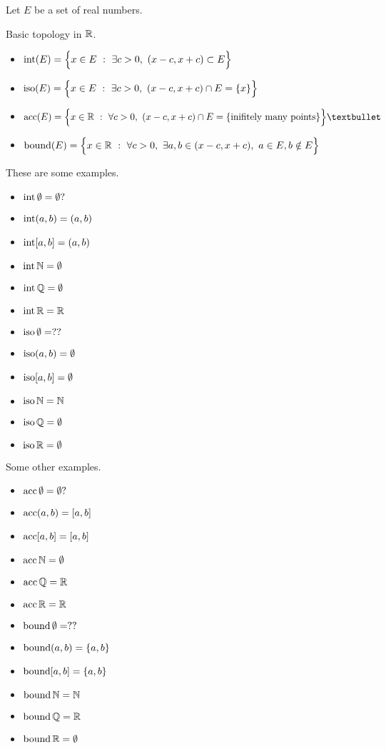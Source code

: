 Let $E$ be a set of real numbers.
\begin{definition}
  Basic topology in $\R$.
  \begin{itemize}
    \item $\operatorname{int}(E)=\Big\{x\in E~:~ \exists c>0,~(x-c,x+c)\subset E\Big\}$
    \item $\operatorname{iso}(E)=\Big\{x\in E~:~ \exists c>0,~(x-c,x+c)\cap E=\{x\}\Big\}$
    \item $\Acc(E)=\Big\{x\in\R\st \forall c>0,~(x-c,x+c)\cap E=\{\text{inifitely many points}\}\Big\}•$
    \item $\Bnd(E)=\Big\{x\in\R\st \forall c>0,~\exists a,b\in (x-c,x+c),~a\in E,b\notin E\Big\}$
  \end{itemize}
\end{definition}
\begin{example}
  These are some examples.
  \begin{multicols}{2}
  \begin{itemize}
    \item $\operatorname{int}\emptyset=\emptyset?$
    \item $\operatorname{int}(a,b)=(a,b)$
    \item $\operatorname{int}[a,b]=(a,b)$
    \item $\Int\N=\emptyset$
    \item $\Int\Q=\emptyset$
    \item $\Int\R=\R$
    \item $\operatorname{iso}\emptyset=??$
    \item $\operatorname{iso}(a,b)=\emptyset$
    \item $\operatorname{iso}[a,b]=\emptyset$
    \item $\Iso\N=\N$
    \item $\Iso\Q=\emptyset$
    \item $\Iso\R=\emptyset$
  \end{itemize}
  \end{multicols}
\end{example}

\begin{example}
  Some other examples.
  \begin{multicols}{2}
    \begin{itemize}
      \item $\operatorname{acc}\emptyset=\emptyset?$
      \item $\operatorname{acc}(a,b)=[a,b]$
      \item $\operatorname{acc}[a,b]=[a,b]$
      \item $\Acc\N=\emptyset$
      \item $\Acc\Q=\R$
      \item $\Acc\R=\R$
      \item $\operatorname{bound}\emptyset=??$
      \item $\operatorname{bound}(a,b)=\left\{a,b\right\}$
      \item $\operatorname{bound}[a,b]=\left\{a,b\right\}$
      \item $\Bnd\N=\N$
      \item $\Bnd\Q=\R$
      \item $\Bnd\R=\emptyset$
    \end{itemize}
  \end{multicols}
\end{example}




